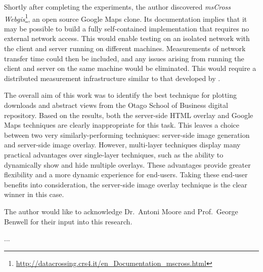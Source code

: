 \documentclass[acmnow]{acmtrans2m}
\begin{document}
Shortly after completing the experiments, the author discovered
\emph{msCross Web\-gis}\footnote{\url{http://datacrossing.crs4.it/en_Documentation_mscross.html}},
an open source Google Maps clone. Its documentation implies that it may
be possible to build a fully self-contained implementation that requires
no external network access. This would enable testing on an isolated
network with the client and server running on different machines.
Measurements of network transfer time could then be included, and any
issues arising from running the client and server on the same machine
would be eliminated. This would require a distributed measurement
infrastructure similar to that developed by .

The overall aim of this work was to identify the best technique for
plotting downloads and abstract views from the Otago School of Business
digital repository. Based on the results, both the server-side HTML
overlay and Google Maps techniques are clearly inappropriate for this
task. This leaves a choice between two very similarly-performing
techniques: server-side image generation and server-side image overlay.
However, multi-layer techniques display many practical advantages over
single-layer techniques, such as the ability to dynamically show and
hide multiple overlays. These advantages provide greater flexibility and
a more dynamic experience for end-users. Taking these end-user benefits
into consideration, the server-side image overlay technique is the clear
winner in this case.


\begin{acks}
The author would like to acknowledge Dr.\ Antoni Moore and Prof.\ George
Benwell for their input into this research.
\end{acks}





\begin{received}
...
\end{received}
\end{document}

